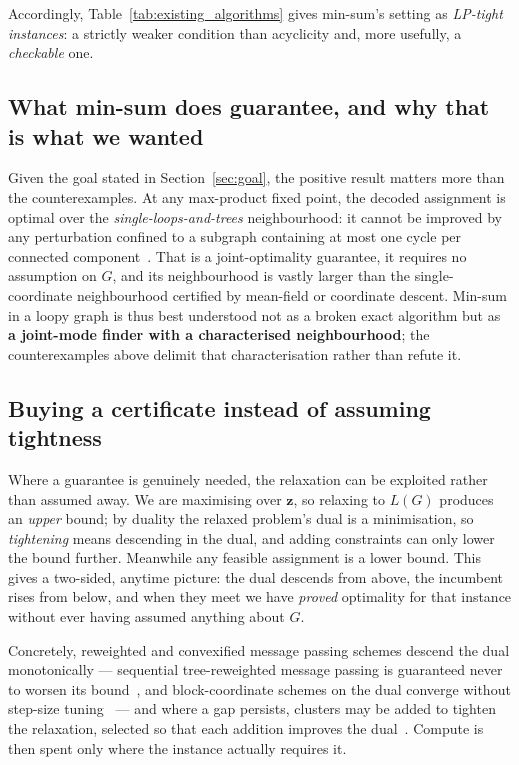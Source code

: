 Accordingly, Table~\ref{tab:existing_algorithms} gives min-sum's setting as \emph{LP-tight instances}: a strictly weaker condition than acyclicity and, more usefully, a \emph{checkable} one.

\subsection{What min-sum does guarantee, and why that is what we wanted}

Given the goal stated in Section~\ref{sec:goal}, the positive result matters more than the counterexamples. At any max-product fixed point, the decoded assignment is optimal over the \emph{single-loops-and-trees} neighbourhood: it cannot be improved by any perturbation confined to a subgraph containing at most one cycle per connected component~\citep{WeissFreeman2001}. That is a joint-optimality guarantee, it requires no assumption on $G$, and its neighbourhood is vastly larger than the single-coordinate neighbourhood certified by mean-field or coordinate descent. Min-sum in a loopy graph is thus best understood not as a broken exact algorithm but as \textbf{a joint-mode finder with a characterised neighbourhood}; the counterexamples above delimit that characterisation rather than refute it.

\subsection{Buying a certificate instead of assuming tightness}
\label{sec:certificate}

Where a guarantee is genuinely needed, the relaxation can be exploited rather than assumed away. We are maximising over $\mathbf{z}$, so relaxing to $L(G)$ produces an \emph{upper} bound; by duality the relaxed problem's dual is a minimisation, so \emph{tightening} means descending in the dual, and adding constraints can only lower the bound further. Meanwhile any feasible assignment is a lower bound. This gives a two-sided, anytime picture: the dual descends from above, the incumbent rises from below, and when they meet we have \emph{proved} optimality for that instance without ever having assumed anything about $G$.

Concretely, reweighted and convexified message passing schemes descend the dual monotonically --- sequential tree-reweighted message passing is guaranteed never to worsen its bound~\citep{Kolmogorov2006}, and block-coordinate schemes on the dual converge without step-size tuning~\citep{Globerson2007} --- and where a gap persists, clusters may be added to tighten the relaxation, selected so that each addition improves the dual~\citep{Sontag2008}. Compute is then spent only where the instance actually requires it.

